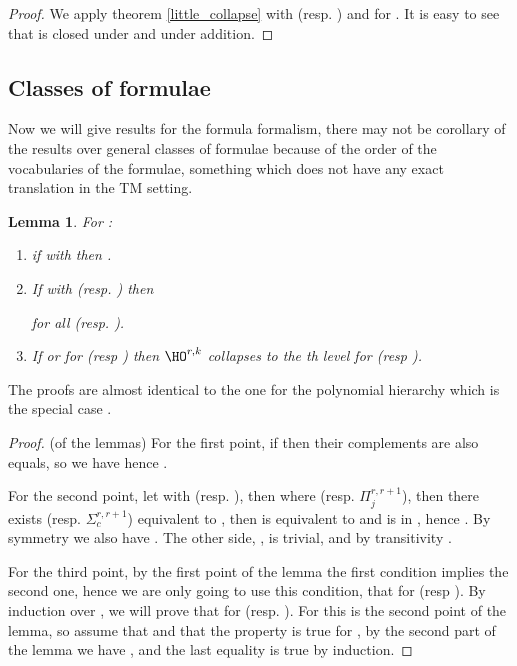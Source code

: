 \documentclass[a4paper,12pt]{article}
\newtheorem{lemma}[theorem]{Lemma}
\theoremstyle{definition}
\newcommand{\hod}[2]{\ensuremath{\HO^{#1,#2}}}
\newcommand{\hoc}[3]{\ensuremath{\Sigma^{#1,#3}_{#2}}}
\newcommand{\cohoc}[3]{\ensuremath{\Pi^{#1,#3}_{#2}}}
\begin{document}
\begin{proof}We apply theorem \ref{little_collapse} with 
  (resp. ) and  for . It is easy to see that
   is closed under  and under addition.
\end{proof}





































\subsection{Classes of formulae}
Now we will give results for the formula formalism, there may
not be corollary of the results over general classes of formulae
because of the order of the vocabularies of the formulae, something
which does not have any exact translation in the TM setting.

\begin{lemma}\label{lem:collapse}For :
  \begin{enumerate}
  \item if  with  then
    .
  \item If  with (resp. )
    then
    
    for all  (resp. ).
\item If  or
     for  (resp ) then
    \hod rk collapses to the th level for  (resp ).
  \end{enumerate}
\end{lemma}

The proofs are almost identical to the one for the polynomial
hierarchy which is the special case .

\begin{proof}(of the lemmas) 
  For the first point, if  then their
  complements are also equals, so we have
   hence
  .

  For the second point, let  with 
  (resp. ), then  where
   (resp. \cohoc{r}{j}{r+1}), then there
  exists  (resp. \hoc{r}{c}{r+1}) equivalent to
  , then  is equivalent to
   and is in , hence
  .  By symmetry we also have
  . The other side,
  , is trivial, and by transitivity
  .

  For the third point, by the first point of the lemma the first
  condition implies the second one, hence we are only going to use
  this condition, that  for 
  (resp ). By induction over , we will prove that
   for 
  (resp. ). For  this is the second point of the lemma, so
  assume that  and that the property is true for , by the
  second part of the lemma we have 
  , and
  the last equality is true by induction.
\end{proof}
\end{document}
